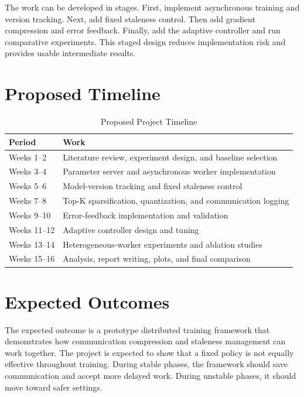 \documentclass[conference]{IEEEtran}
\begin{document}
The work can be developed in stages. First, implement asynchronous training and version tracking. Next, add fixed staleness control. Then add gradient compression and error feedback. Finally, add the adaptive controller and run comparative experiments. This staged design reduces implementation risk and provides usable intermediate results.

\section{Proposed Timeline}

\begin{table}[ht]
\centering
\caption{Proposed Project Timeline}
\label{tab:timeline}
\begin{tabular}{p{} p{}}
\toprule
\textbf{Period} & \textbf{Work} \\
\midrule
Weeks 1--2 & Literature review, experiment design, and baseline selection \\
Weeks 3--4 & Parameter server and asynchronous worker implementation \\
Weeks 5--6 & Model-version tracking and fixed staleness control \\
Weeks 7--8 & Top-K sparsification, quantization, and communication logging \\
Weeks 9--10 & Error-feedback implementation and validation \\
Weeks 11--12 & Adaptive controller design and tuning \\
Weeks 13--14 & Heterogeneous-worker experiments and ablation studies \\
Weeks 15--16 & Analysis, report writing, plots, and final comparison \\
\bottomrule
\end{tabular}
\end{table}

\section{Expected Outcomes}

The expected outcome is a prototype distributed training framework that demonstrates how communication compression and staleness management can work together. The project is expected to show that a fixed policy is not equally effective throughout training. During stable phases, the framework should save communication and accept more delayed work. During unstable phases, it should move toward safer settings.
\end{document}
